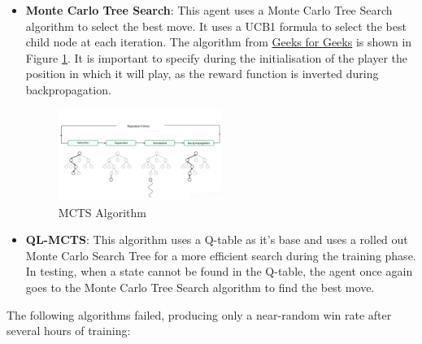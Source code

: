 \begin{itemize}
    \item \textbf{Monte Carlo Tree Search}: This agent uses a Monte Carlo Tree Search algorithm to select the best move. It uses a UCB1 formula to select the best child node at each iteration. The algorithm from \href{https://www.geeksforgeeks.org/ml-monte-carlo-tree-search-mcts/}{Geeks for Geeks} is shown in Figure \ref{fig:mcts}. It is important to specify during the initialisation of the player the position in which it will play, as the reward function is inverted during backpropagation.
    \begin{figure}
        \centering
        \includegraphics[width=0.5\textwidth]{images/mcts.png}
        \caption{MCTS Algorithm}
        \label{fig:mcts}
    \end{figure}

    \item \textbf{QL-MCTS}: This algorithm uses a Q-table as it's base and uses a rolled out Monte Carlo Search Tree for a more efficient search during the training phase. In testing, when a state cannot be found in the Q-table, the agent once again goes to the Monte Carlo Tree Search algorithm to find the best move.
\end{itemize}

The following algorithms failed, producing only a near-random win rate after several hours of training:


